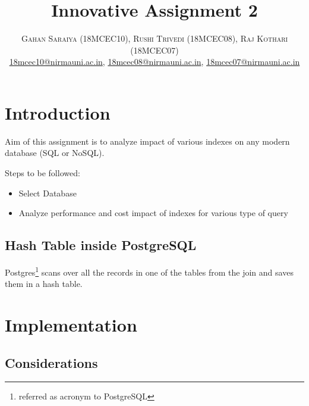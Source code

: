 \documentclass[paper=letter, fontsize=12pt]{article}
\date{}
\title{\vspace{-15mm}\fontsize{24pt}{10pt}\selectfont\textbf{Innovative Assignment 2}} %
\author{
\large
{\textsc{Gahan Saraiya (18MCEC10), Rushi Trivedi (18MCEC08), Raj Kothari (18MCEC07)}}\\[2mm]
\normalsize \href{mailto:18mcec10@nirmauni.ac.in}{18mcec10@nirmauni.ac.in}, %
\normalsize \href{mailto:18mcec10@nirmauni.ac.in}{18mcec08@nirmauni.ac.in}, %
\normalsize \href{mailto:18mcec10@nirmauni.ac.in}{18mcec07@nirmauni.ac.in}\\[2mm] %
}
\begin{document}
\maketitle %
\thispagestyle{fancy} %

\section{Introduction}\label{sec:introduction}
Aim of this assignment is to analyze impact of various indexes on any modern database (SQL or NoSQL).

Steps to be followed:
\begin{itemize}
	\item Select Database
	\item Analyze performance and cost impact of indexes for various type of query
\end{itemize}

\subsection{Hash Table inside PostgreSQL}
Postgres\footnote{referred as acronym to PostgreSQL} scans over all the records in one of the tables from the join and saves them in a hash table.

\section{Implementation}
\label{sec:implementation}
\subsection{Considerations}
\end{document}
